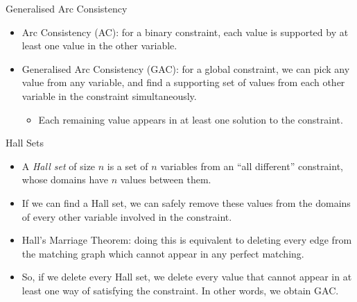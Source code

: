 \documentclass[aspectratio=169,compress,10pt]{beamer}
\begin{document}
\begin{frame}{Generalised Arc Consistency}
    \begin{itemize}
        \item Arc Consistency (AC): for a binary constraint, each value is supported by at least one
            value in the other variable.
        \item Generalised Arc Consistency (GAC): for a global constraint, we can pick any value from any
            variable, and find a supporting set of values from each other variable in the constraint
            simultaneously.
            \begin{itemize}
                \item Each remaining value appears in at least one solution to the constraint.
            \end{itemize}
    \end{itemize}
\end{frame}

\begin{frame}{Hall Sets}
    \begin{itemize}
        \item A \emph{Hall set} of size $n$ is a set of $n$ variables from an ``all different''
            constraint, whose domains have $n$ values between them.

        \item If we can find a Hall set, we can safely remove these values from the domains of every
            other variable involved in the constraint.

        \item Hall's Marriage Theorem: doing this is equivalent to deleting every edge from the
            matching graph which cannot appear in any perfect matching.

        \item So, if we delete every Hall set, we delete every value that cannot appear in at least
            one way of satisfying the constraint. In other words, we obtain GAC.
    \end{itemize}
\end{frame}
\end{document}
